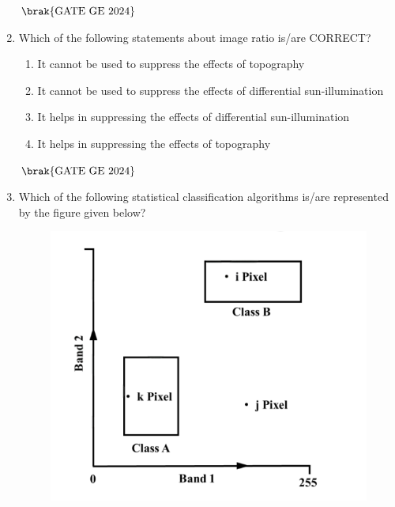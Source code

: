 \documentclass[journal,12pt,onecolumn]{IEEEtran}
\theoremstyle{remark}
\begin{document}
\begin{enumerate}
\begin{center}
\begin{tabular}{cc}
\end{tabular}
\end{center}
\begin{enumerate}
\end{enumerate}
\hfill $\brak{\text{GATE GE 2024}}$
\bigskip
\item Which of the following statements about image ratio is/are CORRECT?
\begin{enumerate}
\item It cannot be used to suppress the effects of topography
\item It cannot be used to suppress the effects of differential sun-illumination
\item It helps in suppressing the effects of differential sun-illumination
\item It helps in suppressing the effects of topography
\end{enumerate}
\hfill $\brak{\text{GATE GE 2024}}$
\bigskip
\item Which of the following statistical classification algorithms is/are represented by the figure given below?
\\
\begin{figure}[H]
    \centering
    \includegraphics[width=0.3\columnwidth]{figs/fig11.png}
    \caption{}
    \label{figs:fig11}
\end{figure}


\end{enumerate}
\end{document}
